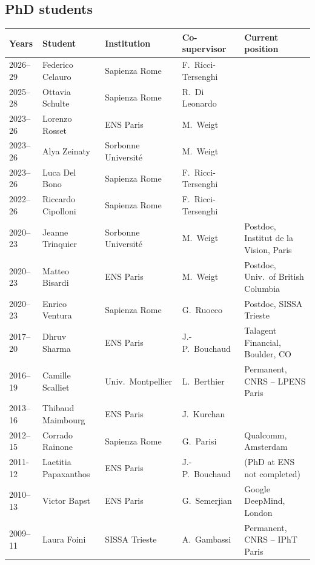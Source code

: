 \documentclass[a4paper,10pt]{article}
\begin{document}
\subsection{PhD students}
\vspace{4pt}
{\small
\begin{tabularx}{\textwidth}{@{}>{\hspace{0pt}\color{datecol}}p{} p{} p{} p{} >{\raggedright\arraybackslash}X@{}}
\textbf{Years} & \textbf{Student} & \textbf{Institution} & \textbf{Co-supervisor} & \textbf{Current position} \\[1pt]
\hline
2026--29 & Federico Celauro & Sapienza Rome & F.~Ricci-Tersenghi & \\
2025--28 & Ottavia Schulte & Sapienza Rome & R.~Di Leonardo & \\
2023--26 & Lorenzo Rosset & ENS Paris & M.~Weigt & \\
2023--26 & Alya Zeinaty & Sorbonne Université & M.~Weigt & \\
2023--26 & Luca Del Bono & Sapienza Rome & F.~Ricci-Tersenghi & \\
2022--26 & Riccardo Cipolloni & Sapienza Rome & F.~Ricci-Tersenghi & \\
2020--23 & Jeanne Trinquier & Sorbonne Université & M.~Weigt & Postdoc, Institut de la Vision, Paris \\
2020--23 & Matteo Bisardi & ENS Paris & M.~Weigt & Postdoc, Univ.~of British Columbia \\
2020--23 & Enrico Ventura & Sapienza Rome & G.~Ruocco & Postdoc, SISSA Trieste \\
2017--20 & Dhruv Sharma & ENS Paris & J.-P.~Bouchaud & Talagent Financial, Boulder, CO \\
2016--19 & Camille Scalliet & Univ.~Montpellier & L.~Berthier & Permanent, CNRS -- LPENS Paris \\
2013--16 & Thibaud Maimbourg & ENS Paris & J.~Kurchan & \\
2012--15 & Corrado Rainone & Sapienza Rome & G.~Parisi & Qualcomm, Amsterdam \\
2011-12 & Laetitia Papaxanthos & ENS Paris & J.-P.~Bouchaud & (PhD at ENS not completed) \\
2010--13 & Victor Bapst & ENS Paris & G.~Semerjian & Google DeepMind, London \\
2009--11 & Laura Foini & SISSA Trieste & A.~Gambassi & Permanent, CNRS -- IPhT Paris \\
\hline
\end{tabularx}}
\end{document}
